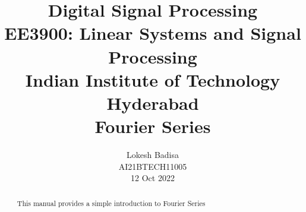 \documentclass[journal,12pt,twocolumn]{IEEEtran}
\numberwithin{equation}{section}
\begin{document}
                             
\title{ Digital Signal Processing \\ \Large EE3900: Linear Systems and Signal Processing \\ \large Indian Institute of Technology Hyderabad \\ \vspace*{12pt} \textbf{Fourier Series}}
\author{Lokesh Badisa\\ \normalsize AI21BTECH11005 \\ \vspace*{20pt} \normalsize 12 Oct 2022  }
 \maketitle 
 \tableofcontents
 \begin{abstract}
    This manual provides a simple introduction to Fourier Series
    \end{abstract}
\end{document}

